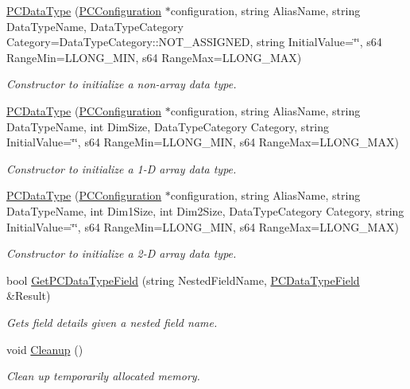 \begin{DoxyCompactItemize}
\hyperlink{classpc__emulator_1_1PCDataType_a8cbc9ebdfa3cdcf2c5e14d9a89146619}{P\+C\+Data\+Type} (\hyperlink{classpc__emulator_1_1PCConfiguration}{P\+C\+Configuration} $\ast$configuration, string Alias\+Name, string Data\+Type\+Name, Data\+Type\+Category Category=Data\+Type\+Category\+::\+N\+O\+T\+\_\+\+A\+S\+S\+I\+G\+N\+ED, string Initial\+Value=\char`\"{}\char`\"{}, s64 Range\+Min=L\+L\+O\+N\+G\+\_\+\+M\+IN, s64 Range\+Max=L\+L\+O\+N\+G\+\_\+\+M\+AX)
\begin{DoxyCompactList}\small\item\em Constructor to initialize a non-\/array data type. \end{DoxyCompactList}\item 
\hyperlink{classpc__emulator_1_1PCDataType_ae6697f7f255e12eb7c72edb1e1820760}{P\+C\+Data\+Type} (\hyperlink{classpc__emulator_1_1PCConfiguration}{P\+C\+Configuration} $\ast$configuration, string Alias\+Name, string Data\+Type\+Name, int Dim\+Size, Data\+Type\+Category Category, string Initial\+Value=\char`\"{}\char`\"{}, s64 Range\+Min=L\+L\+O\+N\+G\+\_\+\+M\+IN, s64 Range\+Max=L\+L\+O\+N\+G\+\_\+\+M\+AX)
\begin{DoxyCompactList}\small\item\em Constructor to initialize a 1-\/D array data type. \end{DoxyCompactList}\item 
\hyperlink{classpc__emulator_1_1PCDataType_a6df10ab73eed90400db983f09367b070}{P\+C\+Data\+Type} (\hyperlink{classpc__emulator_1_1PCConfiguration}{P\+C\+Configuration} $\ast$configuration, string Alias\+Name, string Data\+Type\+Name, int Dim1\+Size, int Dim2\+Size, Data\+Type\+Category Category, string Initial\+Value=\char`\"{}\char`\"{}, s64 Range\+Min=L\+L\+O\+N\+G\+\_\+\+M\+IN, s64 Range\+Max=L\+L\+O\+N\+G\+\_\+\+M\+AX)
\begin{DoxyCompactList}\small\item\em Constructor to initialize a 2-\/D array data type. \end{DoxyCompactList}\item 
bool \hyperlink{classpc__emulator_1_1PCDataType_af36e7db23018ba32ef096b66c0693d49}{Get\+P\+C\+Data\+Type\+Field} (string Nested\+Field\+Name, \hyperlink{classpc__emulator_1_1PCDataTypeField}{P\+C\+Data\+Type\+Field} \&Result)
\begin{DoxyCompactList}\small\item\em Gets field details given a nested field name. \end{DoxyCompactList}\item 
void \hyperlink{classpc__emulator_1_1PCDataType_adf28a74ce0339ba10fd866311ecaa7aa}{Cleanup} ()\hypertarget{classpc__emulator_1_1PCDataType_adf28a74ce0339ba10fd866311ecaa7aa}{}\label{classpc__emulator_1_1PCDataType_adf28a74ce0339ba10fd866311ecaa7aa}

\begin{DoxyCompactList}\small\item\em Clean up temporarily allocated memory. \end{DoxyCompactList}\end{DoxyCompactItemize}
